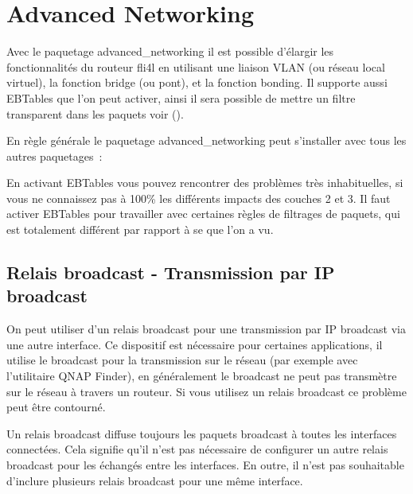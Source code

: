 
{
\section {Advanced Networking}
}

Avec le paquetage advanced\_networking il est possible d'élargir les fonctionnalités
du routeur fli4l en utilisant une liaison VLAN (ou réseau local virtuel),
la fonction bridge (ou pont), et la fonction bonding. Il supporte aussi EBTables que
l'on peut activer, ainsi il sera possible de mettre un filtre transparent dans
les paquets voir ().

En règle générale le paquetage advanced\_networking peut s'installer
avec tous les autres paquetages~:
\smallskip


En activant EBTables vous pouvez rencontrer des problèmes très inhabituelles,
si vous ne connaissez pas à 100\% les différents impacts des couches 2 et 3.
Il faut activer EBTables pour travailler avec certaines règles de filtrages
de paquets, qui est totalement différent par rapport à se que l'on a vu.

\subsection{Relais broadcast - Transmission par IP broadcast}

On peut utiliser d'un relais broadcast pour une transmission par IP broadcast
via une autre interface. Ce dispositif est nécessaire pour certaines applications,
il utilise le broadcast pour la transmission sur le réseau (par exemple avec
l'utilitaire QNAP Finder), en généralement le broadcast ne peut pas transmètre sur
le réseau à travers un routeur. Si vous utilisez un relais broadcast ce problème peut
être contourné.

Un relais broadcast diffuse toujours les paquets broadcast à toutes les interfaces connectées.
Cela signifie qu'il n'est pas nécessaire de configurer un autre relais broadcast pour
les échangés entre les interfaces. En outre, il n'est pas souhaitable d'inclure plusieurs
relais broadcast pour une même interface.

